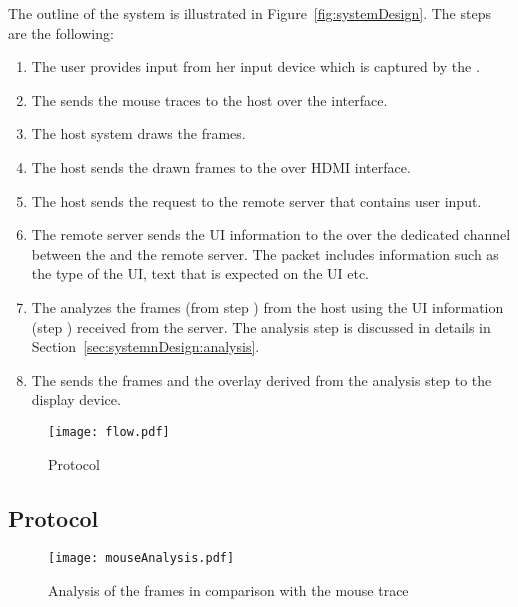 The outline of the system is illustrated in Figure~\ref{fig:systemDesign}. The steps are the following:


\begin{enumerate}
  \item[\one] The user provides input from her input device which is captured by the \device.
  \item[\two] The \device sends the mouse traces to the host over the \bluetooth interface.
  \item[\three] The host system draws the frames.
  \item[\four] The host sends the drawn frames to the \device over HDMI interface.
  \item[\five] The host sends the \http request to the remote server that contains user input. 
  \item[\six] The remote server sends the UI information to the \device over the dedicated \tls channel between the \device and the remote server. The packet includes information such as the type of the UI, text that is expected on the UI etc.
  \item[\seven] The \device analyzes the frames (from step \four) from the host using the UI information (step \six) received from the server. The analysis step is discussed in details in Section~\ref{sec:systemnDesign:analysis}.
  \item[\eight] The \device sends the frames and the overlay derived from the analysis step to the display device.

\end{enumerate}



\begin{figure}[t]
\centering
\texttt{[image: flow.pdf]}
\caption{Protocol}
\label{fig:protocol}
\centering
\end{figure}


\subsection{Protocol}



\begin{figure}[t]
\centering
\texttt{[image: mouseAnalysis.pdf]}
\caption{Analysis of the frames in comparison with the mouse trace}
\label{fig:mouseAnalysis}
\centering
\end{figure}

